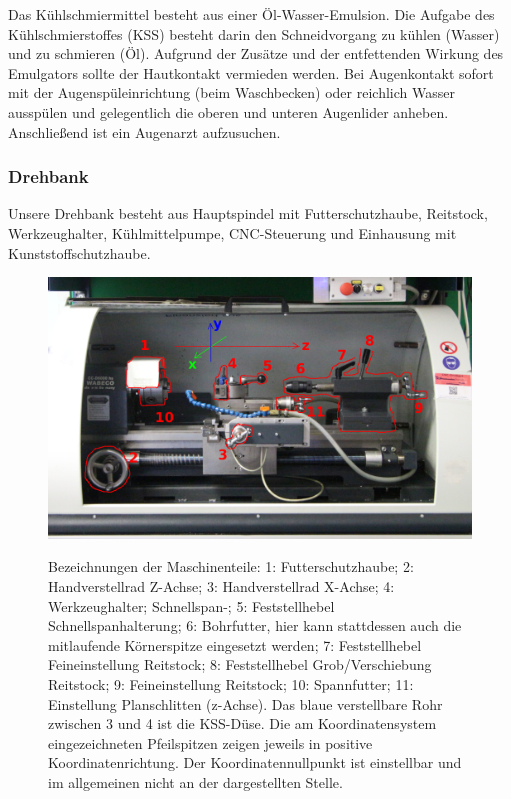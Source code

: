 \documentclass{\basedir/fablab-document}
\begin{document}
Das Kühlschmiermittel besteht aus einer Öl-Wasser-Emulsion.
Die Aufgabe des Kühlschmierstoffes (KSS) besteht darin den Schneidvorgang zu kühlen (Wasser) und zu schmieren (Öl).
Aufgrund der Zusätze und der entfettenden Wirkung des Emulgators sollte der Hautkontakt vermieden werden.
Bei Augenkontakt sofort mit der Augenspüleinrichtung (beim Waschbecken) oder reichlich Wasser ausspülen und gelegentlich die oberen und unteren Augenlider anheben.
Anschließend ist ein Augenarzt aufzusuchen.

\subsubsection{Drehbank}
Unsere Drehbank besteht aus Hauptspindel mit Futterschutzhaube, Reitstock, Werkzeughalter, Kühlmittelpumpe, CNC-Steuerung und Einhausung mit Kunststoffschutzhaube.
\begin{figure}[ht]
\centering
\includegraphics[width = 0.9\linewidth]{img/drehbank-uebersicht-beschreibung} \\
\caption{Bezeichnungen der Maschinenteile: 1: Futterschutzhaube; 2: Handverstellrad Z-Achse; 3: Handverstellrad X-Achse; 4: Werkzeughalter; Schnellspan-; 5: Feststellhebel Schnellspanhalterung; 6: Bohrfutter, hier kann stattdessen auch die mitlaufende Körnerspitze eingesetzt werden; 7: Feststellhebel Feineinstellung Reitstock; 8: Feststellhebel Grob/Verschiebung Reitstock; 9: Feineinstellung Reitstock; 10: Spannfutter; 11: Einstellung Planschlitten (z-Achse). Das blaue verstellbare Rohr zwischen 3 und 4 ist die KSS-Düse. Die am Koordinatensystem eingezeichneten Pfeilspitzen zeigen jeweils in positive Koordinatenrichtung. Der Koordinatennullpunkt ist einstellbar und im allgemeinen nicht an der dargestellten Stelle.}
\end{figure}
\end{document}
